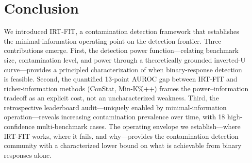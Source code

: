 \documentclass[11pt,a4paper]{article}
\begin{document}
\section{Conclusion}

We introduced IRT-FIT, a contamination detection framework that establishes the minimal-information operating point on the detection frontier.
Three contributions emerge.
First, the detection power function---relating benchmark size, contamination level, and power through a theoretically grounded inverted-U curve---provides a principled characterization of when binary-response detection is feasible.
Second, the quantified 13-point AUROC gap between IRT-FIT and richer-information methods (ConStat, Min-K\%++) frames the power--information tradeoff as an explicit cost, not an uncharacterized weakness.
Third, the retrospective leaderboard audit---uniquely enabled by minimal-information operation---reveals increasing contamination prevalence over time, with 18 high-confidence multi-benchmark cases.
The operating envelope we establish---where IRT-FIT works, where it fails, and why---provides the contamination detection community with a characterized lower bound on what is achievable from binary responses alone.
\end{document}
